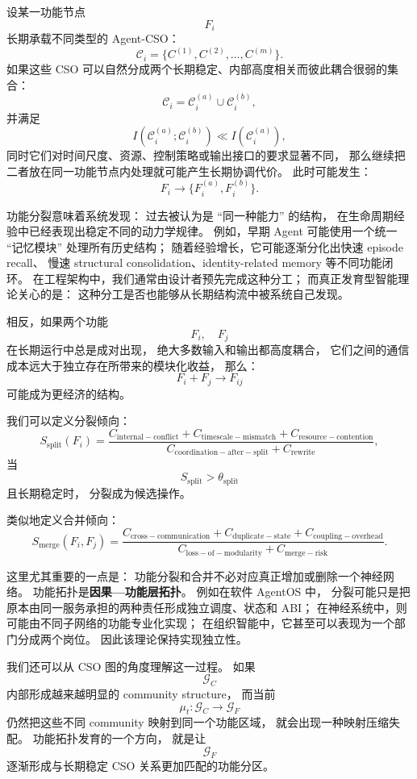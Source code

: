 设某一功能节点
\[
F_i
\]
长期承载不同类型的 Agent-CSO：
\[
\mathcal C_i
=
\{
C^{(1)},C^{(2)},\ldots,C^{(m)}
\}.
\]
如果这些 CSO 可以自然分成两个长期稳定、内部高度相关而彼此耦合很弱的集合：
\[
\mathcal C_i
=
\mathcal C_i^{(a)}
\cup
\mathcal C_i^{(b)},
\]
并满足
\[
I
\left(
\mathcal C_i^{(a)};
\mathcal C_i^{(b)}
\right)
\ll
I
\left(
\mathcal C_i^{(a)}
\right),
\]
同时它们对时间尺度、资源、控制策略或输出接口的要求显著不同，
那么继续把二者放在同一功能节点内处理就可能产生长期协调代价。
此时可能发生：
\[
F_i
\rightarrow
\{F_i^{(a)},F_i^{(b)}\}.
\]

功能分裂意味着系统发现：
过去被认为是 ``同一种能力'' 的结构，
在生命周期经验中已经表现出稳定不同的动力学规律。
例如，早期 Agent 可能使用一个统一 ``记忆模块'' 处理所有历史结构；
随着经验增长，它可能逐渐分化出快速 episode recall、
慢速 structural consolidation、identity-related memory 等不同功能闭环。
在工程架构中，我们通常由设计者预先完成这种分工；
而真正发育型智能理论关心的是：
这种分工是否也能够从长期结构流中被系统自己发现。

相反，如果两个功能
\[
F_i,\quad F_j
\]
在长期运行中总是成对出现，
绝大多数输入和输出都高度耦合，
它们之间的通信成本远大于独立存在所带来的模块化收益，
那么：
\[
F_i+F_j
\rightarrow
F_{ij}
\]
可能成为更经济的结构。

我们可以定义分裂倾向：
\[
S_{\mathrm{split}}(F_i)
=
\frac{
C_{\mathrm{internal-conflict}}
+
C_{\mathrm{timescale-mismatch}}
+
C_{\mathrm{resource-contention}}
}{
C_{\mathrm{coordination-after-split}}
+
C_{\mathrm{rewrite}}
},
\]
当
\[
S_{\mathrm{split}}>\theta_{\mathrm{split}}
\]
且长期稳定时，
分裂成为候选操作。

类似地定义合并倾向：
\[
S_{\mathrm{merge}}(F_i,F_j)
=
\frac{
C_{\mathrm{cross-communication}}
+
C_{\mathrm{duplicate-state}}
+
C_{\mathrm{coupling-overhead}}
}{
C_{\mathrm{loss-of-modularity}}
+
C_{\mathrm{merge-risk}}
}.
\]

这里尤其重要的一点是：
功能分裂和合并不必对应真正增加或删除一个神经网络。
功能拓扑是\textbf{因果—功能层拓扑}。
例如在软件 AgentOS 中，
分裂可能只是把原本由同一服务承担的两种责任形成独立调度、状态和 ABI；
在神经系统中，则可能由不同子网络的功能专业化实现；
在组织智能中，它甚至可以表现为一个部门分成两个岗位。
因此该理论保持实现独立性。

我们还可以从 CSO 图的角度理解这一过程。
如果
\[
\mathcal G_C
\]
内部形成越来越明显的 community structure，
而当前
\[
\mu_t:
\mathcal G_C\rightarrow\mathcal G_F
\]
仍然把这些不同 community 映射到同一个功能区域，
就会出现一种映射压缩失配。
功能拓扑发育的一个方向，
就是让
\[
\mathcal G_F
\]
逐渐形成与长期稳定 CSO 关系更加匹配的功能分区。


